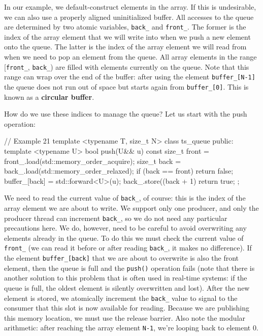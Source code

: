 In our example, we default-construct elements in the array. If this is undesirable, we can also use a properly aligned uninitialized buffer. All accesses to the queue are determined by two atomic variables, \texttt{back\_} and \texttt{front\_}. The former is the index of the array element that we will write into when we push a new element onto the queue. The latter is the index of the array element we will read from when we need to pop an element from the queue. All array elements in the range {[}\texttt{front\_}, \texttt{back\_}) are filled with elements currently on the queue. Note that this range can wrap over the end of the buffer: after using the element \texttt{buffer\_{[}N-1{]}} the queue does not run out of space but starts again from \texttt{buffer\_{[}0{]}}. This is known as a \textbf{circular buffer}.

How do we use these indices to manage the queue? Let us start with the push operation:

\begin{code}
// Example 21
template <typename T, size_t N> class ts_queue {
  public:
  template <typename U> bool push(U&& u) {
    const size_t front =
      front_.load(std::memory_order_acquire);
    size_t back = back_.load(std::memory_order_relaxed);
    if (back == front) return false;
    buffer_[back] = std::forward<U>(u);
    back_.store((back + 1) %
    return true;
  }
};
\end{code}

We need to read the current value of \texttt{back\_}, of course: this is the index of the array element we are about to write. We support only one producer, and only the producer thread can increment \texttt{back\_}, so we do not need any particular precautions here. We do, however, need to be careful to avoid overwriting any elements already in the queue. To do this we must check the current value of \texttt{front\_} (we can read it before or after reading \texttt{back\_}, it makes no difference). If the element \texttt{buffer\_{[}back{]}} that we are about to overwrite is also the front element, then the queue is full and the \texttt{push()} operation fails (note that there is another solution to this problem that is often used in real-time systems: if the queue is full, the oldest element is silently overwritten and lost). After the new element is stored, we atomically increment the \texttt{back\_} value to signal to the consumer that this slot is now available for reading. Because we are publishing this memory location, we must use the release barrier. Also note the modular arithmetic: after reaching the array element \texttt{N-1}, we're looping back to element 0.

